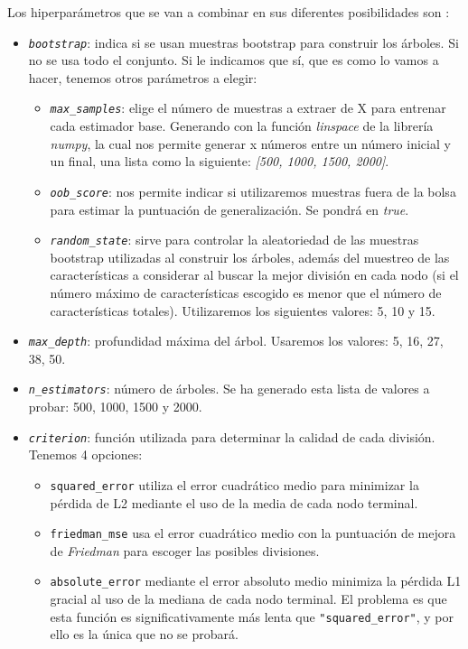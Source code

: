 Los hiperparámetros que se van a combinar en sus diferentes posibilidades son \cite{sklearn:randomforestregressor}:
\begin{itemize}
    \item \texttt{\textit{bootstrap}}: indica si se usan muestras bootstrap para construir los árboles. Si no se usa todo el conjunto. Si le indicamos que sí, que es como lo vamos a hacer, tenemos otros parámetros a elegir:
        \begin{itemize}
            \item \texttt{\textit{max\_samples}}: elige el número de muestras a extraer de X para entrenar cada estimador base. Generando con la función \textit{linspace} de la librería \textit{numpy}, la cual nos permite generar x números entre un número inicial y un final, una lista como la siguiente: \textit{[500, 1000, 1500, 2000]}.
            \item \texttt{\textit{oob\_score}}: nos permite indicar si utilizaremos muestras fuera de la bolsa para estimar la puntuación de generalización. Se pondrá en \textit{true}.
            \item \texttt{\textit{random\_state}}: sirve para controlar la aleatoriedad de las muestras bootstrap utilizadas al construir los árboles, además del muestreo de las características a considerar al buscar la mejor división en cada nodo (si el número máximo de características escogido es menor que el número de características totales). Utilizaremos los siguientes valores: 5, 10 y 15.
        \end{itemize}
    \item \texttt{\textit{max\_depth}}: profundidad máxima del árbol. Usaremos los valores:  5, 16, 27, 38, 50.
    \item \texttt{\textit{n\_estimators}}: número de árboles. Se ha generado esta lista de valores a probar: 500, 1000, 1500 y 2000.
    \item \texttt{\textit{criterion}}: función utilizada para determinar la calidad de cada división. Tenemos 4 opciones:
        \begin{itemize}
            \item \texttt{squared\_error} utiliza el error cuadrático medio para minimizar la pérdida de L2 mediante el uso de la media de cada nodo terminal.
            \item \texttt{friedman\_mse} usa el error cuadrático medio con la puntuación de mejora de \textit{Friedman} para escoger las posibles divisiones.
            \item \texttt{absolute\_error} mediante el error absoluto medio  minimiza la pérdida L1 gracial al uso de la mediana de cada nodo terminal. El problema es que esta función es significativamente más lenta que \texttt{"squared\_error"}, y por ello es la única que no se probará.

\end{itemize}
\end{itemize}
